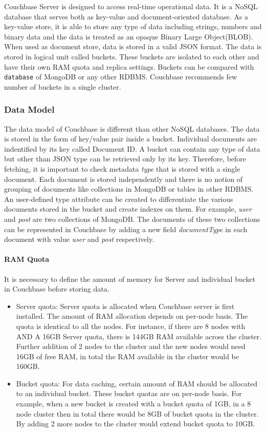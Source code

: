  Couchbase Server is designed to access real-time operational data. It is a NoSQL database that serves both as key-value and document-oriented database. As a key-value store, it is able to store any type of data including  strings, numbers and binary data and the data is treated as an opaque Binary Large Object(BLOB). When used as document store, data is stored in a valid JSON format. The data is stored in logical unit called buckets. These buckets are isolated to each other and have their own RAM quota and replica settings. Buckets can be compared with \texttt{database} of MongoDB or any other RDBMS. Couchbase recommends few number of buckets in a single cluster. 
 
 \subsubsection{Data Model}%
 
The data model of Couchbase is different than other NoSQL databases. The data is stored in the form of key/value pair inside a bucket. Individual documents are indentified by its key called Document ID. A bucket can contain any type of data but other than JSON type can be retrieved only by its key. Therefore, before fetching, it is important to check metadata \textit{type} that is stored with a single document. Each document is stored independently and there is no notion of grouping of documents like collections in MongoDB or tables in other RDBMS. An user-defined type attribute can be created to differentiate the various documents stored in the bucket and  create indexes on them.  For example, \textit{user} and \textit{post} are two collections of MongoDB. The documents of these two collections can be represented in Couchbase by adding a new field \textit{documentType}  in each document with value \textit{user} and \textit{post} respectively. 

\paragraph{RAM Quota}
It is necessary to define the amount of memory for Server and individual bucket in Couchbase before storing data. 
\begin{itemize}
\item {Server quota:}
          Server quota is allocated when Couchbase server is first installed. The amount of RAM allocation depends on per-node basis. The quota is identical to all the nodes. For instance, if there are 8 nodes with AND A 16GB Server quota, there is 144GB RAM available across the cluster. Further addition of 2 nodes to the cluster and the new nodes would need 16GB of free RAM, in total the RAM available in the cluster would be 160GB.   
\item{Bucket quota:}    
For data caching, certain amount of RAM should be allocated to an individual bucket. These bucket quotas are on per-node basis. For example, when a new bucket is created with a bucket quota of 1GB, in a 8 node cluster then in total there would be 8GB of bucket quota in the cluster. By adding 2 more nodes to the cluster would extend bucket quota to 10GB. 
\end{itemize}
           

